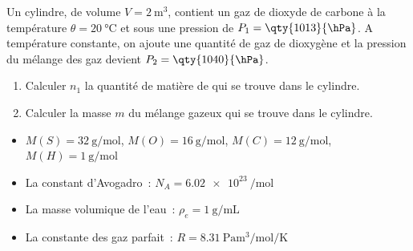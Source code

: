 Un cylindre, de volume $V=\qty{2}{\cubic\m}$, contient un gaz de dioxyde
de carbone  à la température $\theta=\qty{20}{\degreeCelsius}$
et sous une pression de $P_1=\qty{1013}{\hPa}$. A température
constante, on ajoute une quantité de gaz de dioxygène  et la
pression du mélange des gaz devient $P_2=\qty{1040}{\hPa}$.
\begin{enumerate}
    \item Calculer $n_1$ la quantité de matière de  qui se
          trouve dans le cylindre.
    \item Calculer la masse $m$ du mélange gazeux qui se trouve dans
          le cylindre.
\end{enumerate}

\begin{donnees}
    \begin{itemize}
        \item $M(S)=\qty{32}{\g\per\mol}$, $M(O)=\qty{16}{\g\per\mol}$,
              $M(C)=\qty{12}{\g\per\mol}$, $M(H)=\qty{1}{\g\per\mol}$
        \item La constant d'Avogadro~: $N_A=\qty{6.02e23}{\per\mol}$
        \item La masse volumique de l'eau~: $\rho_e=\qty{1}{\g\per\mL}$
        \item La constante des gaz parfait~:
              $R=\qty{8.31}{\Pa\cubic\m\per\mol\per\K}$
    \end{itemize}
\end{donnees}
